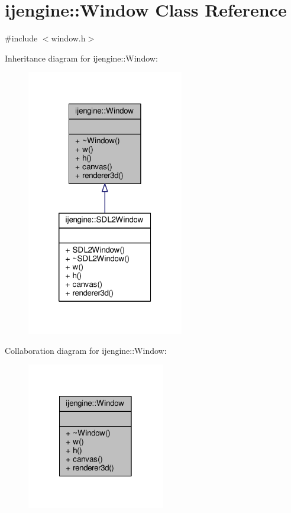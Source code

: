 \hypertarget{classijengine_1_1Window}{\section{ijengine\-:\-:Window Class Reference}
\label{classijengine_1_1Window}
}


{\ttfamily \#include $<$window.\-h$>$}



Inheritance diagram for ijengine\-:\-:Window\-:\nopagebreak
\begin{figure}[H]
\begin{center}
\leavevmode
\includegraphics[width=194pt]{classijengine_1_1Window__inherit__graph}
\end{center}
\end{figure}


Collaboration diagram for ijengine\-:\-:Window\-:\nopagebreak
\begin{figure}[H]
\begin{center}
\leavevmode
\includegraphics[width=170pt]{classijengine_1_1Window__coll__graph}
\end{center}
\end{figure}
